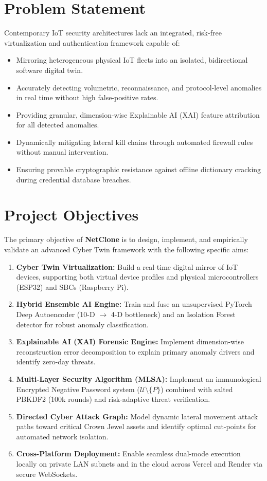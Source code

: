 \documentclass[12pt,a4paper]{report}
\begin{document}
\section{Problem Statement}
Contemporary IoT security architectures lack an integrated, risk-free virtualization and authentication framework capable of:
\begin{itemize}
    \item Mirroring heterogeneous physical IoT fleets into an isolated, bidirectional software digital twin.
    \item Accurately detecting volumetric, reconnaissance, and protocol-level anomalies in real time without high false-positive rates.
    \item Providing granular, dimension-wise Explainable AI (XAI) feature attribution for all detected anomalies.
    \item Dynamically mitigating lateral kill chains through automated firewall rules without manual intervention.
    \item Ensuring provable cryptographic resistance against offline dictionary cracking during credential database breaches.
\end{itemize}

\section{Project Objectives}
The primary objective of \textbf{NetClone} is to design, implement, and empirically validate an advanced Cyber Twin framework with the following specific aims:
\begin{enumerate}
    \item \textbf{Cyber Twin Virtualization:} Build a real-time digital mirror of IoT devices, supporting both virtual device profiles and physical microcontrollers (ESP32) and SBCs (Raspberry Pi).
    \item \textbf{Hybrid Ensemble AI Engine:} Train and fuse an unsupervised PyTorch Deep Autoencoder (10-D $\to$ 4-D bottleneck) and an Isolation Forest detector for robust anomaly classification.
    \item \textbf{Explainable AI (XAI) Forensic Engine:} Implement dimension-wise reconstruction error decomposition to explain primary anomaly drivers and identify zero-day threats.
    \item \textbf{Multi-Layer Security Algorithm (MLSA):} Implement an immunological Encrypted Negative Password system ($\mathcal{U} \setminus \{P\}$) combined with salted PBKDF2 (100k rounds) and risk-adaptive threat verification.
    \item \textbf{Directed Cyber Attack Graph:} Model dynamic lateral movement attack paths toward critical Crown Jewel assets and identify optimal cut-points for automated network isolation.
    \item \textbf{Cross-Platform Deployment:} Enable seamless dual-mode execution locally on private LAN subnets and in the cloud across Vercel and Render via secure WebSockets.
\end{enumerate}
\end{document}
